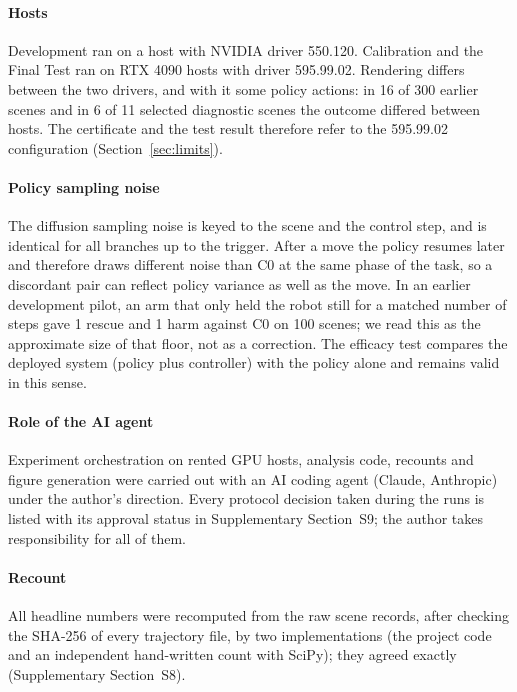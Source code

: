 \documentclass[preprint,12pt]{elsarticle}
\begin{document}
\paragraph{Hosts} Development ran on a host with NVIDIA driver 550.120. Calibration and the Final Test ran on RTX 4090 hosts with driver 595.99.02. Rendering differs between the two drivers, and with it some policy actions: in 16 of 300 earlier scenes and in 6 of 11 selected diagnostic scenes the outcome differed between hosts. The certificate and the test result therefore refer to the 595.99.02 configuration (Section~\ref{sec:limits}).

\paragraph{Policy sampling noise} The diffusion sampling noise is keyed to the scene and the control step, and is identical for all branches up to the trigger. After a move the policy resumes later and therefore draws different noise than C0 at the same phase of the task, so a discordant pair can reflect policy variance as well as the move. In an earlier development pilot, an arm that only held the robot still for a matched number of steps gave 1 rescue and 1 harm against C0 on 100 scenes; we read this as the approximate size of that floor, not as a correction. The efficacy test compares the deployed system (policy plus controller) with the policy alone and remains valid in this sense.

\paragraph{Role of the AI agent} Experiment orchestration on rented GPU hosts, analysis code, recounts and figure generation were carried out with an AI coding agent (Claude, Anthropic) under the author's direction. Every protocol decision taken during the runs is listed with its approval status in Supplementary Section~S9; the author takes responsibility for all of them.

\paragraph{Recount} All headline numbers were recomputed from the raw scene records, after checking the SHA-256 of every trajectory file, by two implementations (the project code and an independent hand-written count with SciPy); they agreed exactly (Supplementary Section~S8).

\end{document}
